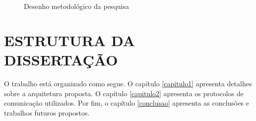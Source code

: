 \begin{figure}[htbp]
\centering
\caption{Desenho metodológico da pesquisa}
\label{fig:desenho_metodologico}
\end{figure}

\section{ESTRUTURA DA DISSERTAÇÃO}

O trabalho está organizado como segue. O capítulo  \ref{capitulo1} apresenta detalhes sobre a arquitetura proposta. O capítulo \ref{capitulo2} apresenta os protocolos de comunicação utilizados. Por fim, o capítulo \ref{conclusao} apresenta as conclusões e trabalhos futuros propostos.